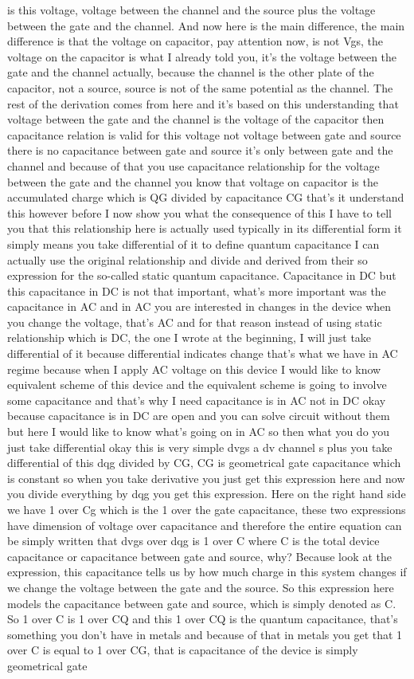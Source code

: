 is this voltage, voltage between the channel and the source plus the voltage between the gate and the channel. And now here is the main difference, the main difference is that the voltage on capacitor, pay attention now, is not Vgs, the voltage on the capacitor is what I already told you, it's the voltage between the gate and the channel actually, because the channel is the other plate of the capacitor, not a source, source is not of the same potential as the channel. The rest of the derivation comes from here and it's based on this understanding that voltage between the gate and the channel is the voltage of the capacitor then capacitance relation is valid for this voltage not voltage between gate and source there is no capacitance between gate and source it's only between gate and the channel and because of that you use capacitance relationship for the voltage between the gate and the channel you know that voltage on capacitor is the accumulated charge which is QG divided by capacitance CG that's it understand this however before I now show you what the consequence of this I have to tell you that this relationship here is actually used typically in its differential form it simply means you take differential of it to define quantum capacitance I can actually use the original relationship and divide and derived from their so expression for the so-called static quantum capacitance. Capacitance in DC but this capacitance in DC is not that important, what's more important was the capacitance in AC and in AC you are interested in changes in the device when you change the voltage, that's AC and for that reason instead of using static relationship which is DC, the one I wrote at the beginning, I will just take differential of it because differential indicates change that's what we have in AC regime because when I apply AC voltage on this device I would like to know equivalent scheme of this device and the equivalent scheme is going to involve some capacitance and that's why I need capacitance is in AC not in DC okay because capacitance is in DC are open and you can solve circuit without them but here I would like to know what's going on in AC so then what you do you just take differential okay this is very simple dvgs a dv channel s plus you take differential of this dqg divided by CG, CG is geometrical gate capacitance which is constant so when you take derivative you just get this expression here and now you divide everything by dqg you get this expression. Here on the right hand side we have 1 over Cg which is the 1 over the gate capacitance, these two expressions have dimension of voltage over capacitance and therefore the entire equation can be simply written that dvgs over dqg is 1 over C where C is the total device capacitance or capacitance between gate and source, why? Because look at the expression, this capacitance tells us by how much charge in this system changes if we change the voltage between the gate and the source. So this expression here models the capacitance between gate and source, which is simply denoted as C. So 1 over C is 1 over CQ and this 1 over CQ is the quantum capacitance, that's something you don't have in metals and because of that in metals you get that 1 over C is equal to 1 over CG, that is capacitance of the device is simply geometrical gate 